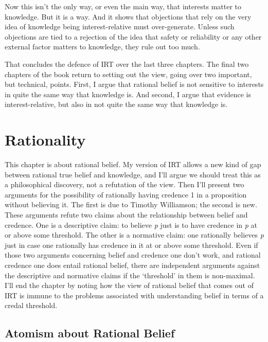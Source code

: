 \documentclass[
  10pt,
  letterpaper,
  twoside]{scrbook}
\begin{document}
Now this isn't the only way, or even the main way, that interests matter
to knowledge. But it is a way. And it shows that objections that rely on
the very idea of knowledge being interest-relative must over-generate.
Unless such objections are tied to a rejection of the idea that safety
or reliability or any other external factor matters to knowledge, they
rule out too much.

That concludes the defence of IRT over the last three chapters. The
final two chapters of the book return to setting out the view, going
over two important, but technical, points. First, I argue that rational
belief is not sensitive to interests in quite the same way that
knowledge is. And second, I argue that evidence is interest-relative,
but also in not quite the same way that knowledge is.


\chapter{Rationality}\label{sec-ratbel}

This chapter is about rational belief. My version of IRT allows a new
kind of gap between rational true belief and knowledge, and I'll argue
we should treat this as a philosophical discovery, not a refutation of
the view. Then I'll present two arguments for the possibility of
rationally having credence 1 in a proposition without believing it. The
first is due to Timothy Williamson; the second is new. These arguments
refute two claims about the relationship between belief and credence.
One is a descriptive claim: to believe \emph{p} just is to have credence
in \emph{p} at or above some threshold. The other is a normative claim:
one rationally believes \emph{p} just in case one rationally has
credence in it at or above some threshold. Even if those two arguments
concerning belief and credence one don't work, and rational credence one
does entail rational belief, there are independent arguments against the
descriptive and normative claims if the `threshold' in them is
non-maximal. I'll end the chapter by noting how the view of rational
belief that comes out of IRT is immune to the problems associated with
understanding belief in terms of a credal threshold.

\section{Atomism about Rational Belief}\label{sec-atomism}
\end{document}
